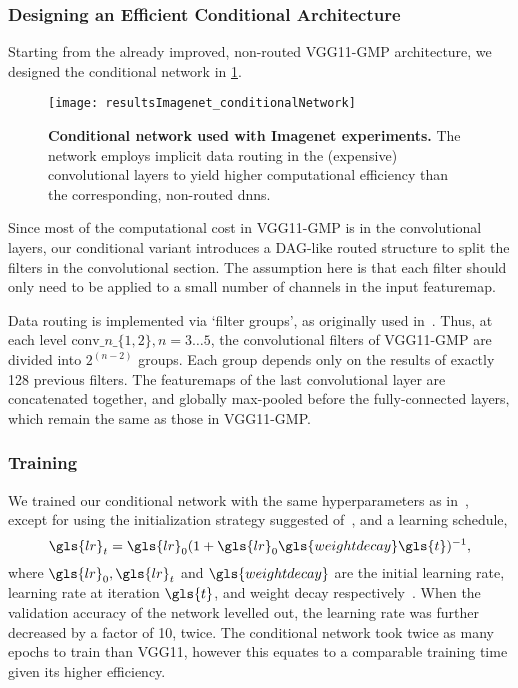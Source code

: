 \documentclass[thesis]{subfiles}
\begin{document}
	\subsubsection{Designing an Efficient Conditional Architecture}
	Starting from the already improved, non-routed VGG11-GMP architecture, we designed the conditional network in \cref{fig:Imagenet_CondNet}.
	\begin{figure}[tbp]
		\centering
		\texttt{[image: resultsImagenet\_conditionalNetwork]}
		\caption[Conditional network used with ILSVRC experiments]{\textbf{Conditional network used with Imagenet experiments.} The network employs implicit data routing in the (expensive) convolutional layers to yield higher computational efficiency than the corresponding, non-routed \glspl{dnn}.}\label{fig:Imagenet_CondNet}
	\end{figure}
	Since most of the computational cost in VGG11-GMP is in the convolutional layers, our conditional variant 
	introduces a DAG-like routed structure to split the filters in the convolutional section.
	The assumption here is that each filter should only need to be applied to a small number of channels in the input \gls{featuremap}.
	
	Data routing is implemented via `filter groups', as originally used in~\citep{Krizhevsky2012}. 
	Thus, at each level $\textrm{conv}\_n\_\{1,2\}, n=3\ldots 5$, the convolutional filters of VGG11-GMP are 
	divided into $2^{(n-2)}$ groups. Each group depends only on the results of exactly 128 previous filters. 
	The \glspl{featuremap} of the last convolutional layer are concatenated together, and globally max-pooled
	before the fully-connected layers, which remain the same as those in VGG11-GMP.
	
	\subsubsection{Training}
	We trained our conditional network with the same hyperparameters as in~\citep{Simonyan2014verydeep}, 
	except for using the initialization strategy suggested of~\citep{He2015b}, and a learning schedule,
    \begin{equation}
        \gls{lr}_t = \gls{lr}_0(1+\gls{lr}_0\gls{weightdecay} \gls{t})^{-1},
    \end{equation}
	where $\gls{lr}_0,\gls{lr}_t$ and $\gls{weightdecay}$ are the initial learning rate, learning rate at iteration $\gls{t}$, and weight decay respectively~\citep{Bottou2012sgdtricks}.
	When the validation accuracy of the network levelled out, the learning rate was further decreased by a factor of 10, twice. 
	The conditional network took twice as many epochs to train than VGG11, however this equates to a comparable
	training time given its higher efficiency.
\end{document}
